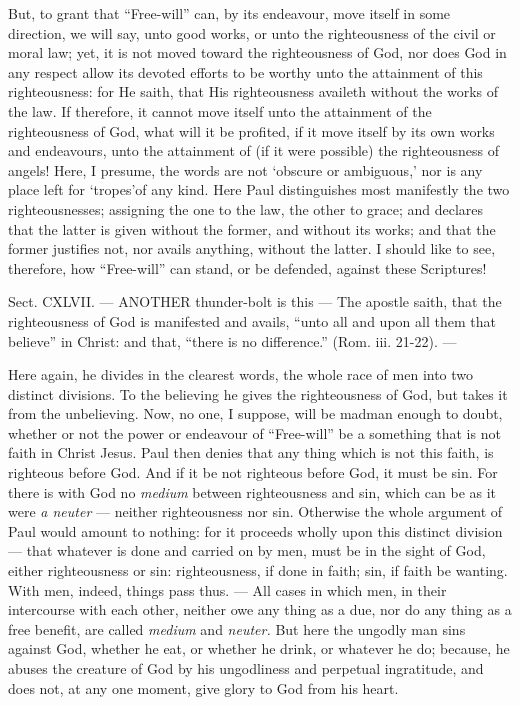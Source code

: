 But, to grant that “Free-will” can, by its endeavour, move itself in some direction, we will say, unto good works, or unto the righteousness of the civil or moral law; yet, it is not moved toward the righteousness of God, nor does God in any respect allow its devoted efforts to be worthy unto the attainment of this righteousness: for He saith, that His righteousness availeth without the works of the law. If therefore, it cannot move itself unto the attainment of the righteousness of God, what will it be profited, if it move itself by its own works and endeavours, unto the attainment of (if it were possible) the righteousness of angels! Here, I presume, the words are not ‘obscure or ambiguous,’ nor is any place left for ‘tropes’of any kind. Here Paul distinguishes most manifestly the two righteousnesses; assigning the one to the law, the other to grace; and declares that the latter is given without the former, and without its works; and that the former justifies not, nor avails anything, without the latter. I should like to see, therefore, how “Free-will” can stand, or be defended, against these Scriptures!


Sect. CXLVII. — ANOTHER thunder-bolt is this — The apostle saith, that the righteousness of God is manifested and avails, “unto all and upon all them that believe” in Christ: and that, “there is no difference.” (Rom. iii. 21-22). —

Here again, he divides in the clearest words, the whole race of men into two distinct divisions. To the believing he gives the righteousness of God, but takes it from the unbelieving. Now, no one, I suppose, will be madman enough to doubt, whether or not the power or endeavour of “Free-will” be a something that is not faith in Christ Jesus. Paul then denies that any thing which is not this faith, is righteous before God. And if it be not righteous before God, it must be sin. For there is with God no \emph{medium }between righteousness and sin, which can be as it were \emph{a neuter} — neither righteousness nor sin. Otherwise the whole argument of Paul would amount to nothing: for it proceeds wholly upon this distinct division — that whatever is done and carried on by men, must be in the sight of God, either righteousness or sin: righteousness, if done in faith; sin, if faith be wanting. With men, indeed, things pass thus. — All cases in which men, in their intercourse with each other, neither owe any thing as a due, nor do any thing as a free benefit, are called \emph{medium }and \emph{neuter. }But here the ungodly man sins against God, whether he eat, or whether he drink, or whatever he do; because, he abuses the creature of God by his ungodliness and perpetual ingratitude, and does not, at any one moment, give glory to God from his heart.

